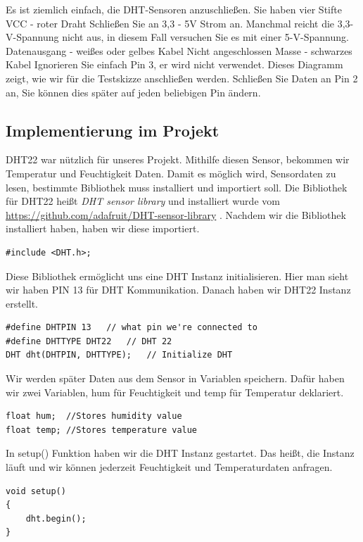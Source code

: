\documentclass[conference]{IEEEtran}
\begin{document}
Es ist ziemlich einfach, die DHT-Sensoren anzuschließen. Sie haben vier Stifte VCC - roter Draht Schließen Sie an 3,3 - 5V Strom an. Manchmal reicht die 3,3-V-Spannung nicht aus, in diesem Fall versuchen Sie es mit einer 5-V-Spannung. Datenausgang - weißes oder gelbes Kabel Nicht angeschlossen Masse - schwarzes Kabel Ignorieren Sie einfach Pin 3, er wird nicht verwendet. Dieses Diagramm zeigt, wie wir für die Testskizze anschließen werden. Schließen Sie Daten an Pin 2 an, Sie können dies später auf jeden beliebigen Pin ändern.

\subsection{Implementierung im Projekt}
DHT22 war nützlich für unseres Projekt. Mithilfe diesen Sensor, bekommen wir Temperatur und Feuchtigkeit Daten. Damit es möglich wird, Sensordaten zu lesen, bestimmte Bibliothek muss installiert und importiert soll. Die Bibliothek für DHT22 heißt \textit{DHT sensor library} und installiert wurde vom \url{https://github.com/adafruit/DHT-sensor-library} . Nachdem wir die Bibliothek installiert haben, haben wir diese importiert.


\begin{lstlisting}[style=CStyle]
#include <DHT.h>;
\end{lstlisting}

Diese Bibliothek ermöglicht uns eine DHT Instanz initialisieren. Hier man sieht wir haben PIN 13 für DHT Kommunikation. Danach haben wir DHT22 Instanz erstellt.

\begin{lstlisting}[style=CStyle]
#define DHTPIN 13	// what pin we're connected to
#define DHTTYPE DHT22	// DHT 22 
DHT dht(DHTPIN, DHTTYPE);	// Initialize DHT 
\end{lstlisting}

Wir werden später Daten aus dem Sensor in Variablen speichern. Dafür haben wir zwei Variablen, \textsf{hum} für Feuchtigkeit und \textsf{temp} für Temperatur deklariert. 

\begin{lstlisting}[style=CStyle]
float hum;	//Stores humidity value
float temp;	//Stores temperature value
\end{lstlisting}

In \textsf{setup()} Funktion haben wir die DHT Instanz gestartet. Das heißt, die Instanz läuft und wir können jederzeit Feuchtigkeit und Temperaturdaten anfragen. 

\begin{lstlisting}[style=CStyle]
void setup()
{
	dht.begin();
}
\end{lstlisting}
\end{document}
